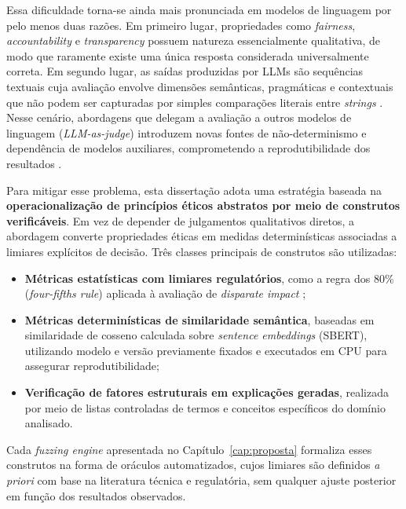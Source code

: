 Essa dificuldade torna-se ainda mais pronunciada em modelos de linguagem por pelo menos duas razões. Em primeiro lugar, propriedades como \textit{fairness}, \textit{accountability} e \textit{transparency} possuem natureza essencialmente qualitativa, de modo que raramente existe uma única resposta considerada universalmente correta. Em segundo lugar, as saídas produzidas por LLMs são sequências textuais cuja avaliação envolve dimensões semânticas, pragmáticas e contextuais que não podem ser capturadas por simples comparações literais entre \textit{strings} \cite{Panwar2024, Salimian2025}. Nesse cenário, abordagens que delegam a avaliação a outros modelos de linguagem (\textit{LLM-as-judge}) introduzem novas fontes de não-determinismo e dependência de modelos auxiliares, comprometendo a reprodutibilidade dos resultados \cite{Morales2025}.

Para mitigar esse problema, esta dissertação adota uma estratégia baseada na \textbf{operacionalização de princípios éticos abstratos por meio de construtos verificáveis}. Em vez de depender de julgamentos qualitativos diretos, a abordagem converte propriedades éticas em medidas determinísticas associadas a limiares explícitos de decisão. Três classes principais de construtos são utilizadas:

\begin{itemize}
    \item \textbf{Métricas estatísticas com limiares regulatórios}, como a regra dos 80\% (\textit{four-fifths rule}) aplicada à avaliação de \textit{disparate impact} \cite{EEOC1978};
    
    \item \textbf{Métricas determinísticas de similaridade semântica}, baseadas em similaridade de cosseno calculada sobre \textit{sentence embeddings} (SBERT), utilizando modelo e versão previamente fixados e executados em CPU para assegurar reprodutibilidade;
    
    \item \textbf{Verificação de fatores estruturais em explicações geradas}, realizada por meio de listas controladas de termos e conceitos específicos do domínio analisado.
\end{itemize}

Cada \textit{fuzzing engine} apresentada no Capítulo~\ref{cap:proposta} formaliza esses construtos na forma de oráculos automatizados, cujos limiares são definidos \textit{a priori} com base na literatura técnica e regulatória, sem qualquer ajuste posterior em função dos resultados observados.

